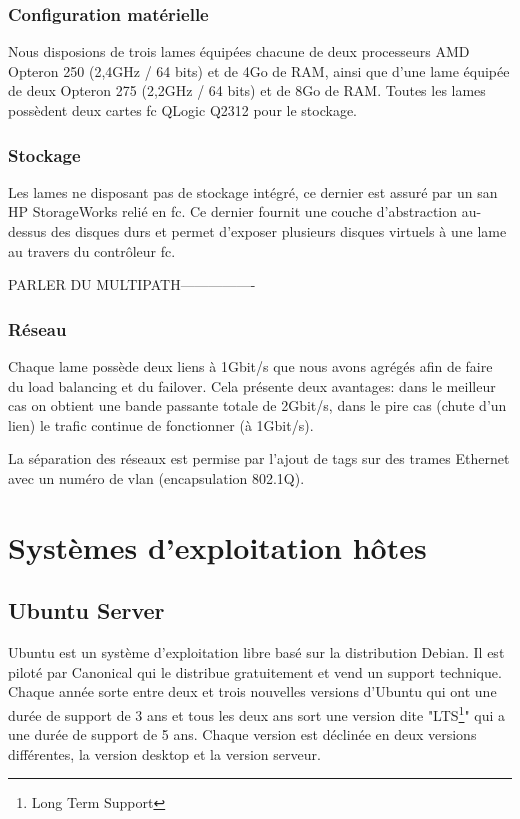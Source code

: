 \documentclass[a4paper,oneside]{report}
\begin{document}
\subsection{Configuration matérielle}
Nous disposions de trois lames équipées chacune de deux processeurs AMD Opteron 250 (2,4GHz / 64 bits) et de 4Go de RAM, ainsi que d'une lame équipée de deux Opteron 275 (2,2GHz / 64 bits) et de 8Go de RAM.\newline
Toutes les lames possèdent deux cartes \gls{fc} QLogic Q2312 pour le stockage.

\subsection{Stockage}
Les lames ne disposant pas de stockage intégré, ce dernier est assuré par un \gls{san} HP StorageWorks relié en \gls{fc}.
Ce dernier fournit une couche d'abstraction au-dessus des disques durs et permet d'exposer plusieurs disques \og virtuels \fg  à une lame au travers du contrôleur \gls{fc}.

PARLER DU MULTIPATH----------------

\subsection{Réseau}
Chaque lame possède deux liens à 1Gbit/s que nous avons agrégés afin de faire du \gls{load balancing} et du \gls{failover}. Cela présente deux avantages: dans le meilleur cas on obtient une bande passante totale de 2Gbit/s, dans le pire cas (chute d'un lien) le trafic continue de fonctionner (à 1Gbit/s).

La séparation des réseaux est permise par l'ajout de tags sur des trames Ethernet avec un numéro de \gls{vlan} (encapsulation 802.1Q).


\chapter{Systèmes d'exploitation hôtes}
\section{Ubuntu Server} \label{cha:ubuntu}
Ubuntu est un système d'exploitation libre basé sur la distribution Debian. Il est piloté par Canonical qui le distribue gratuitement et vend un support technique.
Chaque année sorte entre deux et trois nouvelles versions d'Ubuntu qui ont une durée de support de 3 ans et tous les deux ans sort une version dite "LTS\footnote{Long Term Support}" qui a une durée de support de 5 ans. Chaque version est déclinée en deux versions différentes, la version desktop et la version serveur.
\end{document}
